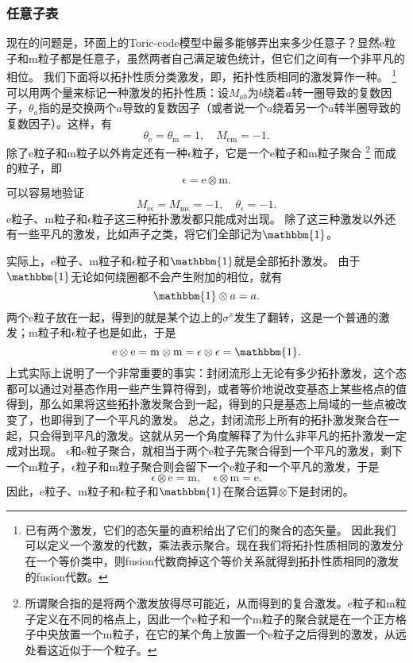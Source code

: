 \documentclass[hyperref, UTF8, a4paper]{ctexart}
\begin{document}
\subsubsection{任意子表}

现在的问题是，环面上的Toric-code模型中最多能够弄出来多少任意子？显然e粒子和m粒子都是任意子，虽然两者自己满足玻色统计，但它们之间有一个非平凡的相位。
我们下面将以拓扑性质分类激发，即，拓扑性质相同的激发算作一种。%
\footnote{
    已有两个激发，它们的态矢量的直积给出了它们的聚合的态矢量。
    因此我们可以定义一个激发的代数，乘法表示聚合。现在我们将拓扑性质相同的激发分在一个等价类中，则fusion代数商掉这个等价关系就得到拓扑性质相同的激发的fusion代数。
}%
可以用两个量来标记一种激发的拓扑性质：设$M_{ab}$为$b$绕着$a$转一圈导致的复数因子，$\theta_a$指的是交换两个$a$导致的复数因子（或者说一个$a$绕着另一个$a$转半圈导致的复数因子）。这样，有
\begin{equation}
    \theta_\mathrm{e} = \theta_\mathrm{m} = 1, \quad M_\mathrm{em} = - 1.
\end{equation}
除了e粒子和m粒子以外肯定还有一种$\mathrm{\epsilon}$粒子，它是一个e粒子和m粒子聚合%
\footnote{所谓聚合指的是将两个激发放得尽可能近，从而得到的复合激发。e粒子和m粒子定义在不同的格点上，因此一个e粒子和一个m粒子的聚合就是在一个正方格子中央放置一个m粒子，在它的某个角上放置一个e粒子之后得到的激发，从远处看这近似于一个粒子。}%
而成的粒子，即
\begin{equation}
    \mathrm{\epsilon} = \mathrm{e} \otimes \mathrm{m}.
\end{equation}
可以容易地验证
\begin{equation}
    M_\mathrm{e\epsilon} = M_\mathrm{m\epsilon} = -1, \quad \theta_\mathrm{\epsilon} = -1.
\end{equation}
e粒子、m粒子和$\mathrm{\epsilon}$粒子这三种拓扑激发都只能成对出现。
除了这三种激发以外还有一些平凡的激发，比如声子之类，将它们全部记为$\mathbbm{1}$。

实际上，e粒子、m粒子和$\epsilon$粒子和$\mathbbm{1}$就是全部拓扑激发。
由于$\mathbbm{1}$无论如何绕圈都不会产生附加的相位，就有
\[
    \mathbbm{1} \otimes a = a.
\]
两个e粒子放在一起，得到的就是某个边上的$\sigma^x$发生了翻转，这是一个普通的激发；m粒子和$\mathrm{\epsilon}$粒子也是如此，于是
\[
    \mathrm{e} \otimes \mathrm{e} = \mathrm{m} \otimes \mathrm{m} = \mathrm{\epsilon} \otimes \mathrm{\epsilon} = \mathbbm{1}.
\]
上式实际上说明了一个非常重要的事实：封闭流形上无论有多少拓扑激发，这个态都可以通过对基态作用一些产生算符得到，或者等价地说改变基态上某些格点的值得到，那么如果将这些拓扑激发聚合到一起，得到的只是基态上局域的一些点被改变了，也即得到了一个平凡的激发。
总之，封闭流形上所有的拓扑激发聚合在一起，只会得到平凡的激发。这就从另一个角度解释了为什么非平凡的拓扑激发一定成对出现。
$\mathrm{\epsilon}$和e粒子聚合，就相当于两个e粒子先聚合得到一个平凡的激发，剩下一个m粒子，$\mathrm{\epsilon}$粒子和m粒子聚合则会留下一个e粒子和一个平凡的激发，于是
\[
    \mathrm{\epsilon} \otimes \mathrm{e} = \mathrm{m}, \quad \mathrm{\epsilon} \otimes \mathrm{m} = \mathrm{e}.
\]
因此，e粒子、m粒子和$\epsilon$粒子和$\mathbbm{1}$在聚合运算$\otimes$下是封闭的。
\end{document}
